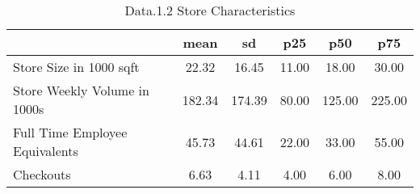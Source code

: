 \begin{table}[htbp]
\caption{\label{clabel} Data.1.2 Store Characteristics}\centering\medskip
\begin{tabular}{lccccc} \hline \hline
 & mean  & sd  & p25  & p50  & p75  \\  \hline 
Store Size in 1000 sqft &        22.32 &        16.45 &        11.00 &        18.00 &        30.00 \\  
Store Weekly Volume in 1000s &       182.34 &       174.39 &        80.00 &       125.00 &       225.00 \\  
Full Time Employee Equivalents &        45.73 &        44.61 &        22.00 &        33.00 &        55.00 \\  
Checkouts &         6.63 &         4.11 &         4.00 &         6.00 &         8.00 \\  
\hline \hline \end{tabular}
\end{table}
